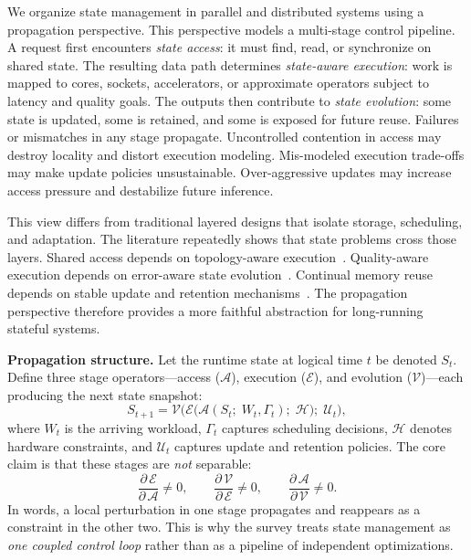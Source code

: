 \documentclass[acmsmall,screen,review]{acmart}
\newcommand{\sysproblem}{state management in parallel and distributed systems\xspace}
\begin{document}
We organize \sysproblem using a propagation perspective. This perspective models a multi-stage control pipeline. A request first encounters \emph{state access}: it must find, read, or synchronize on shared state. The resulting data path determines \emph{state-aware execution}: work is mapped to cores, sockets, accelerators, or approximate operators subject to latency and quality goals. The outputs then contribute to \emph{state evolution}: some state is updated, some is retained, and some is exposed for future reuse. Failures or mismatches in any stage propagate. Uncontrolled contention in access may destroy locality and distort execution modeling. Mis-modeled execution trade-offs may make update policies unsustainable. Over-aggressive updates may increase access pressure and destabilize future inference.

This view differs from traditional layered designs that isolate storage, scheduling, and adaptation. The literature repeatedly shows that state problems cross those layers. Shared access depends on topology-aware execution~\cite{zhang2019briskstream,zhang2020concurrent}. Quality-aware execution depends on error-aware state evolution~\cite{zeng2024pecj}. Continual memory reuse depends on stable update and retention mechanisms~\cite{zhou2025ferret,li2026streamfp,zhang2026flowrag}. The propagation perspective therefore provides a more faithful abstraction for long-running stateful systems.

\smallskip\noindent\textbf{Propagation structure.}
Let the runtime state at logical time \(t\) be denoted \(S_t\).
Define three stage operators---access (\(\mathcal{A}\)), execution (\(\mathcal{E}\)), and evolution (\(\mathcal{V}\))---each producing the next state snapshot:
\[
S_{t+1}= \mathcal{V}\bigl(\mathcal{E}\bigl(\mathcal{A}(S_t;\;W_t,\Gamma_t);\;\mathcal{H}\bigr);\;\mathcal{U}_t\bigr),
\]
where \(W_t\) is the arriving workload, \(\Gamma_t\) captures scheduling decisions, \(\mathcal{H}\) denotes hardware constraints, and \(\mathcal{U}_t\) captures update and retention policies.
The core claim is that these stages are \emph{not} separable:
\[
\frac{\partial\,\mathcal{E}}{\partial\,\mathcal{A}}\neq 0,\qquad
\frac{\partial\,\mathcal{V}}{\partial\,\mathcal{E}}\neq 0,\qquad
\frac{\partial\,\mathcal{A}}{\partial\,\mathcal{V}}\neq 0.
\]
In words, a local perturbation in one stage propagates and reappears as a constraint in the other two.
This is why the survey treats state management as \emph{one coupled control loop} rather than as a pipeline of independent optimizations.
\end{document}
